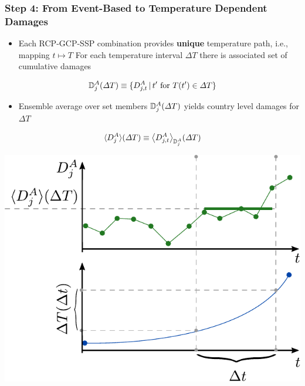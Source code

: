 \documentclass[
c,
11pt,
aspectratio=169, %
final,
]{beamer}
\begin{document}
\begin{frame}
  \frametitle{Step 4: From Event-Based to Temperature Dependent Damages}
  \begin{minipage}[t]{.6\linewidth}
    \vspace{0pt}
  \begin{itemize}
  \item Each RCP-GCP-SSP combination provides \textbf{unique} temperature path, i.e., mapping $t \mapsto T$
    \arrowitem For each temperature interval $\Delta T$ there is associated set of cumulative damages
  \end{itemize}
    \begin{equation*}
   \mathbb{D}^A_{j}(\Delta T)\equiv\lbrace D^A_{j,t}\, \vert\, t' \text{ for } T(t')\in\Delta T \rbrace
 \end{equation*}
 \vspace{-20pt}
\begin{itemize}
\item Ensemble average over set members $\mathbb{D}^A_{j}(\Delta T)$ yields country level damages for $\Delta T$  
\end{itemize}
\begin{equation*}
  \langle D^A_{j}\rangle(\Delta T)\equiv\big\langle D^A_{j,t}\big\rangle_{\mathbb{D}^A_{j}}(\Delta T)
\end{equation*}
\end{minipage}\hfill
\begin{minipage}[t]{.4\linewidth}
  \vspace{20pt}
  \centering
  \includegraphics[width=\linewidth]{figures/damage_averaging}
\end{minipage}
\end{frame}
\end{document}
